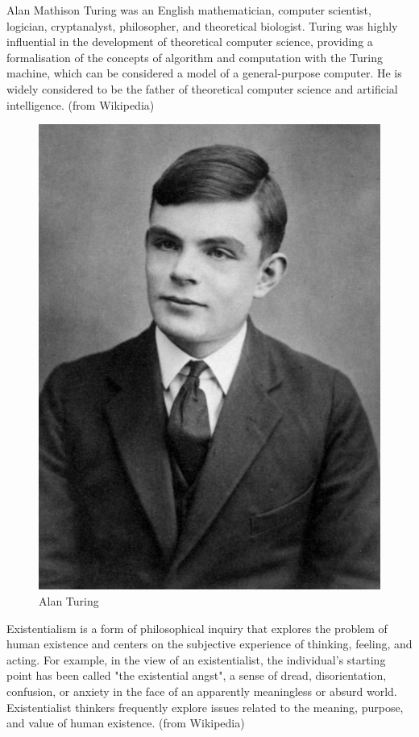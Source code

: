 \documentclass{article}
\begin{document}
Alan Mathison Turing was an English mathematician, computer scientist, logician, cryptanalyst, philosopher, and theoretical biologist. Turing was highly influential in the development of theoretical computer science, providing a formalisation of the concepts of algorithm and computation with the Turing machine, which can be considered a model of a general-purpose computer. He is widely considered to be the father of theoretical computer science and artificial intelligence. (from Wikipedia)

\begin{figure}[!htbp]
	\centering
    \includegraphics[width=0.5\linewidth]{Turing.jpeg}
    \caption{Alan Turing}
\end{figure}

\clearpage

Existentialism is a form of philosophical inquiry that explores the problem of human existence and centers on the subjective experience of thinking, feeling, and acting. For example, in the view of an existentialist, the individual's starting point has been called "the existential angst", a sense of dread, disorientation, confusion, or anxiety in the face of an apparently meaningless or absurd world. Existentialist thinkers frequently explore issues related to the meaning, purpose, and value of human existence. (from Wikipedia)
\end{document}
